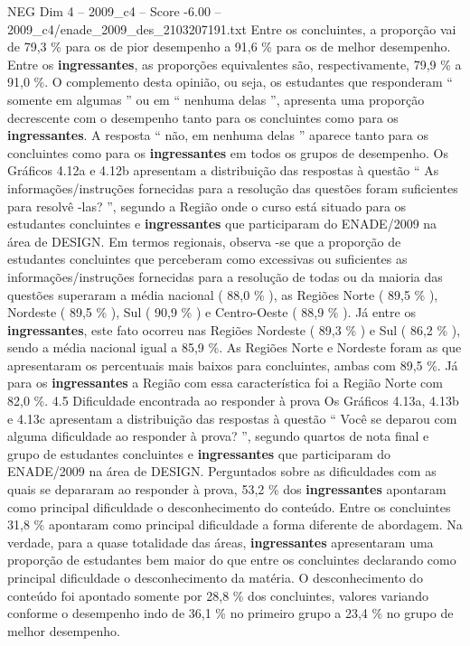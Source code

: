 \begin{textsample}{NEG Dim 4 – 2009\_c4 – Score -6.00 – 2009\_c4/enade\_2009\_des\_2103207191.txt}
Entre os concluintes, a proporção vai de 79,3 \% para os de pior desempenho a 91,6 \% para os de melhor desempenho.
Entre os \textbf{ingressantes}, as proporções equivalentes são, respectivamente, 79,9 \% a 91,0 \%.
O complemento desta opinião, ou seja, os estudantes que responderam “ somente em algumas ” ou em “ nenhuma delas ”, apresenta uma proporção decrescente com o desempenho tanto para os concluintes como para os \textbf{ingressantes}.
A resposta “ não, em nenhuma delas ” aparece tanto para os concluintes como para os \textbf{ingressantes} em todos os grupos de desempenho.
Os Gráficos 4.12a e 4.12b apresentam a distribuição das respostas à questão “ As informações/instruções fornecidas para a resolução das questões foram suficientes para resolvê -las? ”, segundo a Região onde o curso está situado para os estudantes concluintes e \textbf{ingressantes} que participaram do ENADE/2009 na área de DESIGN.
Em termos regionais, observa -se que a proporção de estudantes concluintes que perceberam como excessivas ou suficientes as informações/instruções fornecidas para a resolução de todas ou da maioria das questões superaram a média nacional ( 88,0 \% ), as Regiões Norte ( 89,5 \% ), Nordeste ( 89,5 \% ), Sul ( 90,9 \% ) e Centro-Oeste ( 88,9 \% ).
Já entre os \textbf{ingressantes}, este fato ocorreu nas Regiões Nordeste ( 89,3 \% ) e Sul ( 86,2 \% ), sendo a média nacional igual a 85,9 \%.
As Regiões Norte e Nordeste foram as que apresentaram os percentuais mais baixos para concluintes, ambas com 89,5 \%.
Já para os \textbf{ingressantes} a Região com essa característica foi a Região Norte com 82,0 \%. 4.5 Dificuldade encontrada ao responder à prova Os Gráficos 4.13a, 4.13b e 4.13c apresentam a distribuição das respostas à questão “ Você se deparou com alguma dificuldade ao responder à prova? ”, segundo quartos de nota final e grupo de estudantes concluintes e \textbf{ingressantes} que participaram do ENADE/2009 na área de DESIGN.
Perguntados sobre as dificuldades com as quais se depararam ao responder à prova, 53,2 \% dos \textbf{ingressantes} apontaram como principal dificuldade o desconhecimento do conteúdo.
Entre os concluintes 31,8 \% apontaram como principal dificuldade a forma diferente de abordagem.
Na verdade, para a quase totalidade das áreas, \textbf{ingressantes} apresentaram uma proporção de estudantes bem maior do que entre os concluintes declarando como principal dificuldade o desconhecimento da matéria.
O desconhecimento do conteúdo foi apontado somente por 28,8 \% dos concluintes, valores variando conforme o desempenho indo de 36,1 \% no primeiro grupo a 23,4 \% no grupo de melhor desempenho.

\end{textsample}
